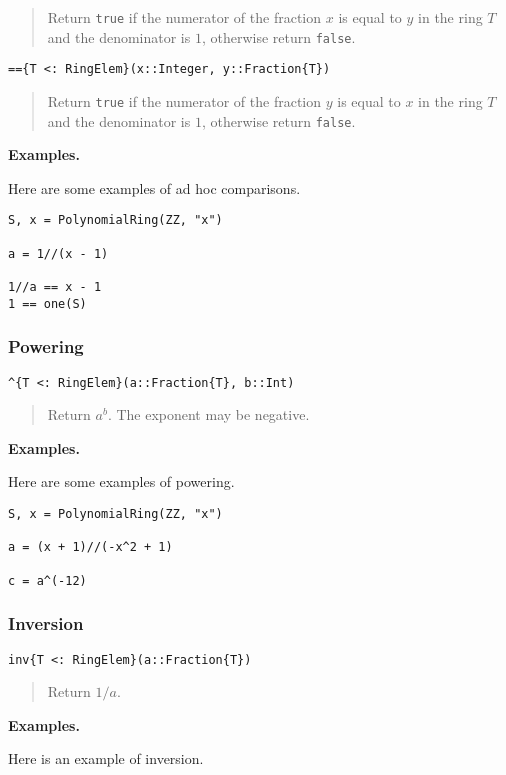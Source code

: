 \documentclass[a4paper,10pt]{article}
\newcommand{\code}{\lstinline}
\newcommand{\desc}[1]{\vspace{-3mm}\begin{quote}#1\end{quote}}
\begin{document}
\desc{Return \code{true} if the numerator of the fraction $x$ is equal to $y$
in the ring $T$ and the denominator is $1$, otherwise return \code{false}.}

\begin{lstlisting}
=={T <: RingElem}(x::Integer, y::Fraction{T})
\end{lstlisting}

\desc{Return \code{true} if the numerator of the fraction $y$ is equal to $x$
in the ring $T$ and the denominator is $1$, otherwise return \code{false}.}

\textbf{Examples.}

Here are some examples of ad hoc comparisons.

\begin{lstlisting}
S, x = PolynomialRing(ZZ, "x")

a = 1//(x - 1)

1//a == x - 1
1 == one(S)
\end{lstlisting}

\subsubsection{Powering}

\begin{lstlisting}
^{T <: RingElem}(a::Fraction{T}, b::Int)
\end{lstlisting}

\desc{Return $a^b$. The exponent may be negative.}

\textbf{Examples.}

Here are some examples of powering.

\begin{lstlisting}
S, x = PolynomialRing(ZZ, "x")

a = (x + 1)//(-x^2 + 1)

c = a^(-12)
\end{lstlisting}

\subsubsection{Inversion}

\begin{lstlisting}
inv{T <: RingElem}(a::Fraction{T})
\end{lstlisting}

\desc{Return $1/a$.}

\textbf{Examples.}

Here is an example of inversion.
\end{document}
